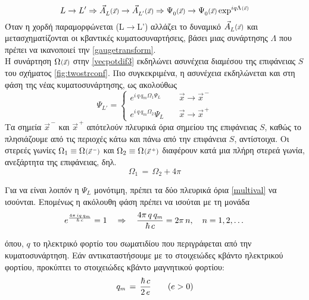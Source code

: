 \begin{equation*}
    L\rightarrow L' \Rightarrow \vecfun[L]{A}{\vec{x}}\rightarrow \vecfun[L']{A}{\vec{x}} \Rightarrow \scafun[0]{\Psi}{\vec{x}} \rightarrow \scafun[0]{\Psi}{\vec{x}}\exp^{iq \scafun{\Lambda}{\vec{x}}}
\end{equation*}
Όταν η χορδή παραμορφώνεται (L$\rightarrow$L') αλλάζει το δυναμικό $\vecfun[L]{A}{\vec{x}}$ και μετασχηματίζονται οι κβαντικές κυματοσυναρτήσεις, βάσει μιας συνάρτησης $\Lambda$ που πρέπει να ικανοποιεί την \eqref{gaugetransform}.\\

Η συνάρτηση $\scafun{\Omega}{\vec{x}}$ στην \eqref{vecpotdif3} %
εκδηλώνει ασυνέχεια  διαμέσου της επιφάνειας $S$ του σχήματος \ref{fig:twostrconf}. Πιο συγκεκριμένα, η ασυνέχεια εκδηλώνεται και στη φάση της νέας κυματοσυνάρτησης, ως ακολούθως
\begin{equation}\label{multival}
    \Psi_{L'} = \left\{\begin{array}{cc}
        e^{i\,q\,q_m\Omega_1\Psi_L} & \quad\Vec{x}\rightarrow \vec{x}^{\,-}  \\ \\
        e^{i\,q\,q_m\Omega_2}\Psi_L & \quad\Vec{x}\rightarrow \vec{x}^{\,+}
    \end{array}\right.
\end{equation}
Τα σημεία $\vec{x}^{\,-}$ και  $\vec{x}^{\,+}$ απότελούν πλευρικά όρια σημείου της επιφάνειας $S$, καθώς το πλησιάζουμε από τις περιοχές κάτω και πάνω από την επιφάνεια $S$, αντίστοιχα. Οι στερεές γωνίες $\Omega_1 \equiv \scafun{\Omega}{\vec{x}^{\,-}}$ και $\Omega_2 \equiv \scafun{\Omega}{\vec{x}^{\,+}}$ διαφέρουν κατά μια πλήρη στερεά γωνία, ανεξάρτητα της επιφάνειας, δηλ.
\begin{equation*}
    \Omega_1 \,=\, \Omega_2 + 4\pi
\end{equation*} 

Για να είναι λοιπόν η $\Psi_L$ μονότιμη, πρέπει τα δύο πλευρικά όρια \eqref{multival} να ισούνται. Επομένως η ακόλουθη φάση πρέπει να ισούται με τη μονάδα \cite{Dirac:1931kp}
\begin{equation}
    e^{\frac{4\pi\,iq\,q\subscr{m}}{\hbar\,c}} = 1 \quad \Rightarrow \quad \frac{4\pi\,q\,q\subscr{m}}{\hbar\,c} = 2\pi\,n, \quad n=1,2,\dots
\end{equation}

όπου, $q$ το ηλεκτρικό φορτίο του σωματιδίου που περιγράφεται από την κυματοσυνάρτηση. Εάν αντικαταστήσουμε με το στοιχειώδες κβάντο ηλεκτρικού φορτίου, προκύπτει το στοιχειώδες κβάντο μαγνητικού φορτίου: 
\begin{equation}\label{quantum magnetic charge}
    q\subscr{m} \,=\, \frac{\hbar\,c}{2\,e}\qquad (e>0)
\end{equation}